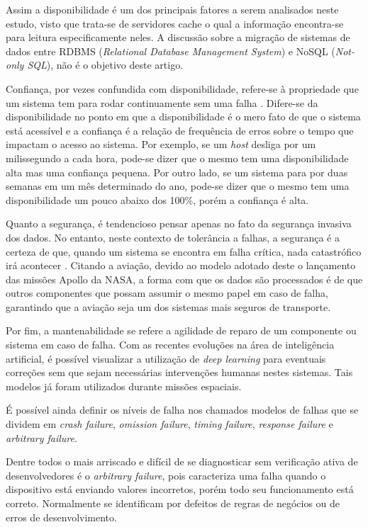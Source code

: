 \documentclass[conference]{IEEEtran}
\begin{document}
Assim a disponibilidade é um dos principais fatores a serem analisados neste estudo, visto que trata-se de servidores cache o qual a informação encontra-se para leitura especificamente neles. A discussão sobre a migração de sistemas de dados entre RDBMS (\textit{Relational Database Management System}) e NoSQL (\textit{Not-only SQL}), não é o objetivo deste artigo.

Confiança, por vezes confundida com disponibilidade, refere-se à propriedade que um sistema tem para rodar continuamente sem uma falha \cite{Tanenbaum:2006:DSP:1202502}. Difere-se da disponibilidade no ponto em que a disponibilidade é o mero fato de que o sistema está acessível e a confiança é a relação de frequência de erros sobre o tempo que impactam o acesso ao sistema. Por exemplo, se um \textit{host} desliga por um milissegundo a cada hora, pode-se dizer que o mesmo tem uma disponibilidade alta mas uma confiança pequena. Por outro lado, se um sistema para por duas semanas em um mês determinado do ano, pode-se dizer que o mesmo tem uma disponibilidade um pouco abaixo dos 100\%, porém a confiança é alta.

Quanto a segurança, é tendencioso pensar apenas no fato da segurança invasiva dos dados. No entanto, neste contexto de tolerância a falhas, a segurança é a certeza de que, quando um sistema se encontra em falha crítica, nada catastrófico irá acontecer \cite{Tanenbaum:2006:DSP:1202502}. Citando a aviação, devido ao modelo adotado deste o lançamento das missões Apollo da NASA, a forma com que os dados são processados é de que outros componentes que possam assumir o mesmo papel em caso de falha, garantindo que a aviação seja um dos sistemas mais seguros de transporte. \cite{herman}

Por fim, a mantenabilidade se refere a agilidade de reparo de um componente ou sistema em caso de falha. Com as recentes evoluções na área de inteligência artificial, é possível visualizar a utilização de \textit{deep learning} para eventuais correções sem que sejam necessárias intervenções humanas nestes sistemas. Tais modelos já foram utilizados durante missões espaciais.

É possível ainda definir os níveis de falha nos chamados modelos de falhas que se dividem em \textit{crash failure}, \textit{omission failure}, \textit{timing failure}, \textit{response failure} e \textit{arbitrary failure}.

Dentre todos o mais arriscado e difícil de se diagnosticar sem verificação ativa de desenvolvedores é o \textit{arbitrary failure}, pois caracteriza uma falha quando o dispositivo está enviando valores incorretos, porém todo seu funcionamento está correto. Normalmente se identificam por defeitos de regras de negócios ou de erros de desenvolvimento.
\end{document}

